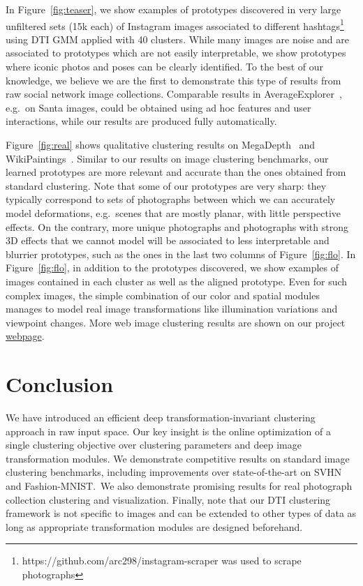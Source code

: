 \documentclass{article}
\begin{document}
\vspace{-0.3em}
In Figure~\ref{fig:teaser}, we show examples of prototypes discovered in very large 
unfiltered sets (15k each) of Instagram images associated to different 
hashtags\footnote{https://github.com/arc298/instagram-scraper was used to scrape photographs} 
using DTI GMM applied with 40 clusters. While many images are noise and are associated to 
prototypes which are not easily interpretable, we show prototypes where iconic photos and 
poses can be clearly identified. To the best of our knowledge, we believe we are the first to 
demonstrate this type of results from raw social network image collections. Comparable 
results in AverageExplorer~\cite{zhu2014averageExplorer}, e.g.\ on Santa images, could be 
obtained using ad hoc features and user interactions, while our results are produced fully 
automatically.

\vspace{-0.3em}
Figure~\ref{fig:real} shows qualitative clustering results on 
MegaDepth~\cite{li2018megadepth} and WikiPaintings~\cite{karayev2013recognizing}.
Similar to our results on image clustering benchmarks, our learned prototypes are more 
relevant and accurate than the ones obtained from standard clustering. Note that some of our 
prototypes are very sharp: they typically correspond to sets of photographs between which we 
can accurately model deformations, e.g.\ scenes that are mostly planar, with little 
perspective effects. On the contrary, more unique photographs and photographs with strong 3D 
effects that we cannot model will be associated to less interpretable and blurrier 
prototypes, such as the ones in the last two columns of Figure~\ref{fig:flo}. In 
Figure~\ref{fig:flo}, in addition to the prototypes discovered, we show examples of images 
contained in each cluster as well as the aligned prototype. Even for such complex images, the 
simple combination of our color and spatial modules manages to model real image 
transformations like illumination variations and viewpoint changes. More web image clustering 
results are shown on our project 
\href{http://imagine.enpc.fr/~monniert/DTIClustering/}{webpage}.
\vspace{-0.5em}

\section{Conclusion}
\vspace{-0.7em}
We have introduced an efficient deep transformation-invariant clustering approach in raw 
input space. Our key insight is the online optimization of a single clustering objective over 
clustering parameters and deep image transformation modules. We demonstrate competitive 
results on standard image clustering benchmarks, including improvements over state-of-the-art 
on SVHN and Fashion-MNIST.\ We also demonstrate promising results for real photograph
collection clustering and visualization. Finally, note that our DTI clustering framework is 
not specific to images and can be extended to other types of data as long as appropriate 
transformation modules are designed beforehand.
\vspace{-0.5em}
\end{document}
